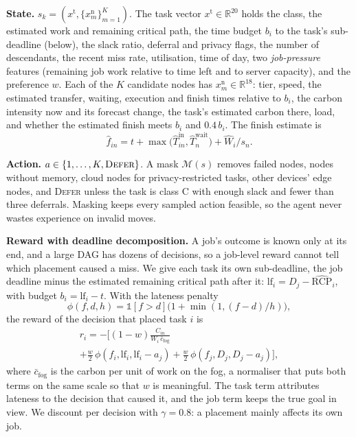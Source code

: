 \documentclass[conference]{IEEEtran}
\begin{document}
\textbf{State.} $s_k=(x^{\mathrm t},\{x^{\mathrm n}_m\}_{m=1}^K)$. The task vector $x^{\mathrm t}\in\mathbb R^{20}$ holds the class, the estimated work and remaining critical path, the time budget $b_i$ to the task's sub-deadline (below), the slack ratio, deferral and privacy flags, the number of descendants, the recent miss rate, utilisation, time of day, two \emph{job-pressure} features (remaining job work relative to time left and to server capacity), and the preference $w$. Each of the $K$ candidate nodes has $x^{\mathrm n}_m\in\mathbb R^{18}$: tier, speed, the estimated transfer, waiting, execution and finish times relative to $b_i$, the carbon intensity now and its forecast change, the task's estimated carbon there, load, and whether the estimated finish meets $b_i$ and $0.4\,b_i$. The finish estimate is
\begin{equation}
\hat f_{in}=t+\max\big(\hat T^{\mathrm{in}}_{in},\hat T^{\mathrm{wait}}_n\big)+\hat W_i/s_n. \label{eq:finish}
\end{equation}

\textbf{Action.} $a\in\{1,\dots,K,\textsc{Defer}\}$. A mask $\mathcal M(s)$ removes failed nodes, nodes without memory, cloud nodes for privacy-restricted tasks, other devices' edge nodes, and \textsc{Defer} unless the task is class C with enough slack and fewer than three deferrals. Masking keeps every sampled action feasible, so the agent never wastes experience on invalid moves.

\textbf{Reward with deadline decomposition.} A job's outcome is known only at its end, and a large DAG has dozens of decisions, so a job-level reward cannot tell which placement caused a miss. We give each task its own sub-deadline, the job deadline minus the estimated remaining critical path after it: $\mathrm{lf}_i=D_j-\widehat{\mathrm{RCP}}_i$, with budget $b_i=\mathrm{lf}_i-t$. With the lateness penalty
\begin{equation}
\phi(f,d,h)=\mathbb 1[f>d]\big(1+\min(1,(f-d)/h)\big), \label{eq:pen}
\end{equation}
the reward of the decision that placed task $i$ is
\begin{multline}
r_i=-\Big[(1-w)\frac{C_{in}}{W_i\,\bar c_{\mathrm{fog}}}\\+\frac w2\,\phi(f_i,\mathrm{lf}_i,\mathrm{lf}_i-a_j)+\frac w2\,\phi(f_j,D_j,D_j-a_j)\Big], \label{eq:reward}
\end{multline}
where $\bar c_{\mathrm{fog}}$ is the carbon per unit of work on the fog, a normaliser that puts both terms on the same scale so that $w$ is meaningful. The task term attributes lateness to the decision that caused it, and the job term keeps the true goal in view. We discount per decision with $\gamma=0.8$: a placement mainly affects its own job.
\end{document}
